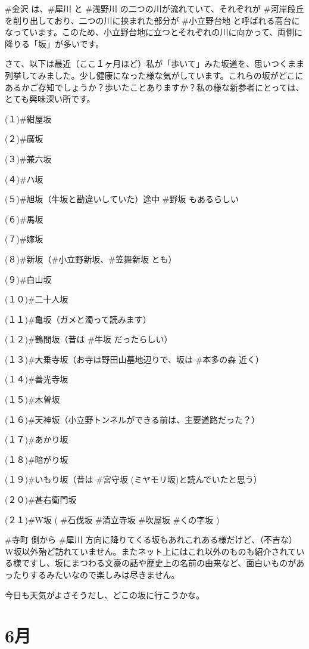 \documentclass[facebook_diary.tex]{subfiles}
\begin{document}
\#金沢 は、\#犀川 と \#浅野川 の二つの川が流れていて、それぞれが \#河岸段丘 を削り出しており、二つの川に挟まれた部分が \#小立野台地 と呼ばれる高台になっています。このため、小立野台地に立つとそれぞれの川に向かって、両側に降りる「坂」が多いです。


さて、以下は最近（ここ１ヶ月ほど）私が「歩いて」みた坂道を、思いつくまま列挙してみました。少し健康になった様な気がしています。これらの坂がどこにあるかご存知でしょうか？歩いたことありますか？私の様な新参者にとっては、とても興味深い所です。


(１)\#紺屋坂

(２)\#廣坂

(３)\#兼六坂

(４)\#ハ坂

(５)\#旭坂（牛坂と勘違いしていた）途中 \#野坂 もあるらしい

(６)\#馬坂

(７)\#嫁坂

(８)\#新坂（\#小立野新坂、\#笠舞新坂 とも）

(９)\#白山坂

(１０)\#二十人坂

(１１)\#亀坂（ガメと濁って読みます）

(１２)\#鶴間坂（昔は \#牛坂 だったらしい）

(１３)\#大乗寺坂（お寺は野田山墓地辺りで、坂は \#本多の森 近く）

(１４)\#善光寺坂

(１５)\#木曽坂

(１６)\#天神坂（小立野トンネルができる前は、主要道路だった？）

(１７)\#あかり坂

(１８)\#暗がり坂

(１９)\#いもり坂（昔は \#宮守坂 (ミヤモリ坂)と読んでいたと思う）

(２０)\#甚右衛門坂

(２１)\#W坂 ( \#石伐坂 \#清立寺坂 \#吹屋坂 \#くの字坂 )


\#寺町 側から \#犀川 方向に降りてくる坂もあれこれある様だけど、（不吉な）W坂以外殆ど訪れていません。またネット上にはこれ以外のものも紹介されている様ですし、坂にまつわる文豪の話や歴史上の名前の由来など、面白いものがあったりするみたいなので楽しみは尽きません。

今日も天気がよさそうだし、どこの坂に行こうかな。

\section{6月}
\end{document}
